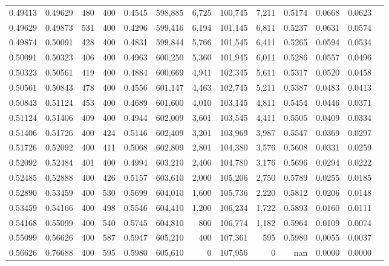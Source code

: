 \begin{tabular}{rrrrrrrrrrrrr}
0.49413 & 0.49629 &    480 & 400 &                                     0.4545 & 598,885 &   6,725 & 100,745 &   7,211 & 0.5174 & 0.0668 & 0.0623 \\
0.49629 & 0.49873 &    531 & 400 &                                     0.4296 & 599,416 &   6,194 & 101,145 &   6,811 & 0.5237 & 0.0631 & 0.0574 \\
0.49874 & 0.50091 &    428 & 400 &                                     0.4831 & 599,844 &   5,766 & 101,545 &   6,411 & 0.5265 & 0.0594 & 0.0534 \\
0.50091 & 0.50323 &    406 & 400 &                                     0.4963 & 600,250 &   5,360 & 101,945 &   6,011 & 0.5286 & 0.0557 & 0.0496 \\
0.50323 & 0.50561 &    419 & 400 &                                     0.4884 & 600,669 &   4,941 & 102,345 &   5,611 & 0.5317 & 0.0520 & 0.0458 \\
0.50561 & 0.50843 &    478 & 400 &                                     0.4556 & 601,147 &   4,463 & 102,745 &   5,211 & 0.5387 & 0.0483 & 0.0413 \\
0.50843 & 0.51124 &    453 & 400 &                                     0.4689 & 601,600 &   4,010 & 103,145 &   4,811 & 0.5454 & 0.0446 & 0.0371 \\
0.51124 & 0.51406 &    409 & 400 &                                     0.4944 & 602,009 &   3,601 & 103,545 &   4,411 & 0.5505 & 0.0409 & 0.0334 \\
0.51406 & 0.51726 &    400 & 424 &                                     0.5146 & 602,409 &   3,201 & 103,969 &   3,987 & 0.5547 & 0.0369 & 0.0297 \\
0.51726 & 0.52092 &    400 & 411 &                                     0.5068 & 602,809 &   2,801 & 104,380 &   3,576 & 0.5608 & 0.0331 & 0.0259 \\
0.52092 & 0.52484 &    401 & 400 &                                     0.4994 & 603,210 &   2,400 & 104,780 &   3,176 & 0.5696 & 0.0294 & 0.0222 \\
0.52485 & 0.52888 &    400 & 426 &                                     0.5157 & 603,610 &   2,000 & 105,206 &   2,750 & 0.5789 & 0.0255 & 0.0185 \\
0.52890 & 0.53459 &    400 & 530 &                                     0.5699 & 604,010 &   1,600 & 105,736 &   2,220 & 0.5812 & 0.0206 & 0.0148 \\
0.53459 & 0.54166 &    400 & 498 &                                     0.5546 & 604,410 &   1,200 & 106,234 &   1,722 & 0.5893 & 0.0160 & 0.0111 \\
0.54168 & 0.55099 &    400 & 540 &                                     0.5745 & 604,810 &     800 & 106,774 &   1,182 & 0.5964 & 0.0109 & 0.0074 \\
0.55099 & 0.56626 &    400 & 587 &                                     0.5947 & 605,210 &     400 & 107,361 &     595 & 0.5980 & 0.0055 & 0.0037 \\
0.56626 & 0.76688 &    400 & 595 &                                     0.5980 & 605,610 &       0 & 107,956 &       0 &    nan & 0.0000 & 0.0000 \\
\bottomrule
\end{tabular}
